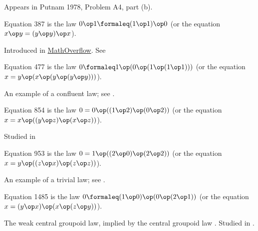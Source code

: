 Appears in Putnam 1978, Problem A4, part (b).

\begin{definition}[Equation 387]\label{eq387}\leanok{}  Equation 387 is the law $0 \op 1  \formaleq  (1 \op 1) \op 0$ (or the equation $x \op y = (y \op y) \op x$).
\end{definition}

Introduced in \href{https://mathoverflow.net/a/450905/766}{MathOverflow}. See 

\begin{definition}[Equation 477]\label{eq477}\leanok{}  Equation 477 is the law $0 \formaleq 1 \op (0 \op (1 \op (1 \op 1)))$ (or the equation $x = y \op (x \op (y \op (y \op y)))$).
\end{definition}

An example of a confluent law; see .

\begin{definition}[Equation 854]\label{eq854}\leanok{}  Equation 854 is the law $0 = 0 \op ((1 \op 2) \op (0 \op 2))$ (or the equation $x = x \op ((y \op z) \op (x \op z))$).
\end{definition}

Studied in 


\begin{definition}[Equation 953]\label{eq953}\leanok{}  Equation 953 is the law $0 = 1 \op ((2 \op 0) \op (2 \op 2))$ (or the equation $x = y \op ((z \op x) \op (z \op z))$).
\end{definition}

An example of a trivial law; see .

\begin{definition}[Equation 1485]\label{eq1485}\leanok{}  Equation 1485 is the law $0 \formaleq  (1 \op 0) \op (0 \op (2 \op 1))$ (or the equation $x = (y \op x) \op (x \op (z \op y))$).
\end{definition}

The weak central groupoid law, implied by the central groupoid law . Studied in .

